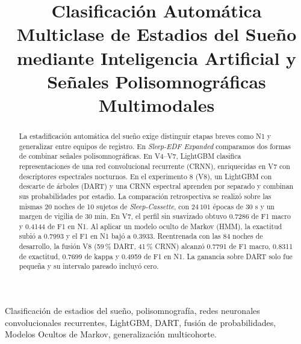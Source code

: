 \documentclass[conference]{IEEEtran}
\begin{document}
\title{Clasificación Automática Multiclase de Estadios del Sueño mediante Inteligencia Artificial y Señales Polisomnográficas Multimodales}

\author{
}

\maketitle

\begin{abstract}
La estadificación automática del sueño exige distinguir etapas breves como N1 y generalizar entre equipos de registro. En \textit{Sleep-EDF Expanded} comparamos dos formas de combinar señales polisomnográficas. En V4--V7, LightGBM clasifica representaciones de una red convolucional recurrente (CRNN), enriquecidas en V7 con descriptores espectrales nocturnos. En el experimento 8 (V8), un LightGBM con descarte de árboles (DART) y una CRNN espectral aprenden por separado y combinan sus probabilidades por estadio. La comparación retrospectiva se realizó sobre las mismas 20 noches de 10 sujetos de \textit{Sleep-Cassette}, con $24\,101$ épocas de 30 s y un margen de vigilia de 30 min. En V7, el perfil sin suavizado obtuvo 0.7286 de F1 macro y 0.4144 de F1 en N1. Al aplicar un modelo oculto de Markov (HMM), la exactitud subió a 0.7993 y el F1 en N1 bajó a 0.3933. Reentrenada con las 84 noches de desarrollo, la fusión V8 (59\,\% DART, 41\,\% CRNN) alcanzó 0.7791 de F1 macro, 0.8311 de exactitud, 0.7699 de kappa y 0.4959 de F1 en N1. La ganancia sobre DART solo fue pequeña y su intervalo pareado incluyó cero.
\end{abstract}

\begin{IEEEkeywords}
Clasificación de estadios del sueño, polisomnografía, redes neuronales convolucionales recurrentes, LightGBM, DART, fusión de probabilidades, Modelos Ocultos de Markov, generalización multicohorte.
\end{IEEEkeywords}

\IEEEpeerreviewmaketitle

\end{document}
